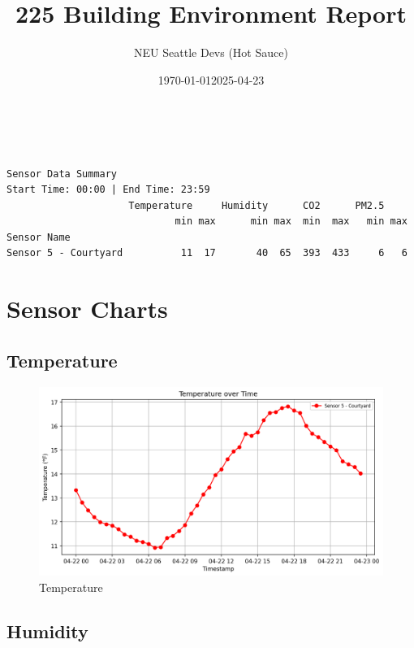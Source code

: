 \documentclass[
  12pt,
  letterpaper,
]{article}
\date{\today}
\title{225 Building Environment Report}
\author{NEU Seattle Devs (Hot Sauce)}
\date{2025-04-23}
\renewcommand*\contentsname{Table of contents}
\newcommand\contentsname{Table of contents}
\begin{document}
\maketitle

\renewcommand*\contentsname{Table of contents}
{
\hypersetup{linkcolor=}
\setcounter{tocdepth}{3}
\tableofcontents
}

\begin{verbatim}


Sensor Data Summary
Start Time: 00:00 | End Time: 23:59
                     Temperature     Humidity      CO2      PM2.5    
                             min max      min max  min  max   min max
Sensor Name                                                          
Sensor 5 - Courtyard          11  17       40  65  393  433     6   6
\end{verbatim}

\section{Sensor Charts}\label{sensor-charts}

\subsection{Temperature}\label{temperature}

\begin{figure}[H]

{\centering \includegraphics[width=0.85\linewidth,height=\textheight,keepaspectratio]{./charts/temperature_chart.png}

}

\caption{Temperature}

\end{figure}%

\subsection{Humidity}\label{humidity}
\end{document}

